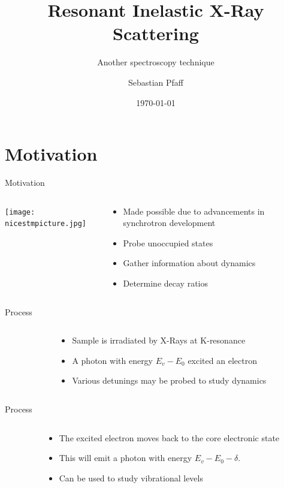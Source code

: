 \documentclass[aspectratio=169]{beamer}
\title[RIXS]{Resonant Inelastic X-Ray Scattering}
\author{Sebastian Pfaff}
\subtitle{Another spectroscopy technique}%
\date{\today}
\institute{Lund University\\Department of Physics}
\begin{document}
\titleframe

\section{Motivation}
\begin{frame}{Motivation}
	\begin{columns}[onlytextwidth]
		\begin{column}{.45\textwidth}
			\texttt{[image: nicestmpicture.jpg]}
		\end{column}
		\begin{column}{.5\textwidth}
			\begin{itemize}
				\item Made possible due to advancements in synchrotron development
				\item Probe unoccupied states
				\item Gather information about dynamics
				\item Determine decay ratios
			\end{itemize}
		\end{column}
		\end{columns}
\end{frame}

\begin{frame}{Process}
	\begin{columns}[onlytextwidth]
		\begin{column}{.45\textwidth}
			
		\end{column}
		\begin{column}{.5\textwidth}
			\begin{itemize}
				\item Sample is irradiated by X-Rays at K-resonance
				\item A photon with energy $E_v-E_0$ excited an electron
				\item Various detunings may be probed to study dynamics
			\end{itemize}
		\end{column}
		\end{columns}
\end{frame}

\begin{frame}{Process}
	\begin{columns}[onlytextwidth]
		\begin{column}{.45\textwidth}
			
		\end{column}
		\begin{column}{.5\textwidth}
			\begin{itemize}
				\item The excited electron moves back to the core electronic state
				\item This will emit a photon with energy $E_v-E_0-\delta$.
				\item Can be used to study vibrational levels
			\end{itemize}
		\end{column}
		\end{columns}
\end{frame}
\end{document}
